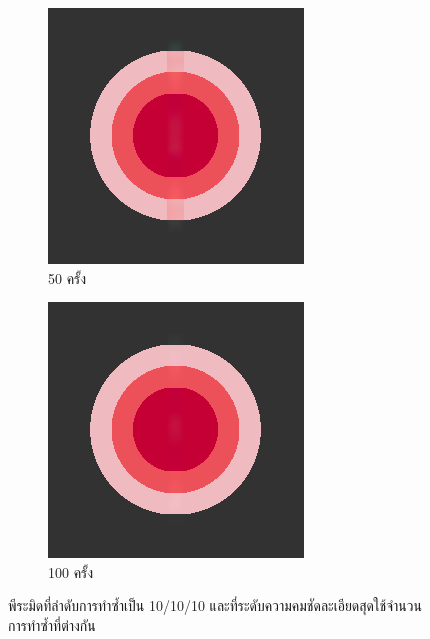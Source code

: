 \begin{figure}[H]
\begin{subfigure}{0.4\linewidth}
        \includegraphics[width=0.7\linewidth]{image/just10enough/only50time.png}			
        \caption{50 ครั้ง}
    \end{subfigure}
    \begin{subfigure}{0.4\linewidth}
        \centering
        \includegraphics[width=0.7\linewidth]{image/just10enough/only100time.png}			
        \caption{100 ครั้ง}
    \end{subfigure}
    \caption{พีระมิดที่ลำดับการทำซ้ำเป็น 10/10/10 และที่ระดับความคมชัดละเอียดสุดใช้จำนวนการทำซ้ำที่ต่างกัน}
\end{figure}

